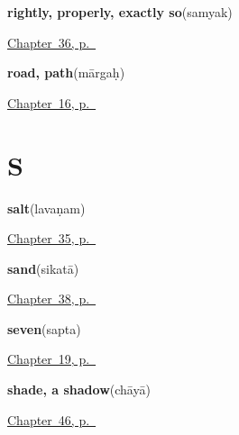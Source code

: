 \noindent\begin{minipage}[t]{\linewidth}
\raggedright
\textbf{rightly, properly, exactly so}\enspace\emph{}\enspace(samyak)\par
\footnotesize \hyperref[ch:sa-replies-more]{Chapter~36, p.~\pageref*{ch:sa-replies-more}}
\end{minipage}\par\smallskip

\noindent\begin{minipage}[t]{\linewidth}
\raggedright
\textbf{road, path}\enspace\emph{}\enspace(mārgaḥ)\par
\footnotesize \hyperref[ch:sa-places]{Chapter~16, p.~\pageref*{ch:sa-places}}
\end{minipage}\par\smallskip

\section*{S}

\noindent\begin{minipage}[t]{\linewidth}
\raggedright
\textbf{salt}\enspace\emph{}\enspace(lavaṇam)\par
\footnotesize \hyperref[ch:sa-house]{Chapter~35, p.~\pageref*{ch:sa-house}}
\end{minipage}\par\smallskip

\noindent\begin{minipage}[t]{\linewidth}
\raggedright
\textbf{sand}\enspace\emph{}\enspace(sikatā)\par
\footnotesize \hyperref[ch:sa-fire-and-stone]{Chapter~38, p.~\pageref*{ch:sa-fire-and-stone}}
\end{minipage}\par\smallskip

\noindent\begin{minipage}[t]{\linewidth}
\raggedright
\textbf{seven}\enspace\emph{}\enspace(sapta)\par
\footnotesize \hyperref[ch:sa-numbers-6-10]{Chapter~19, p.~\pageref*{ch:sa-numbers-6-10}}
\end{minipage}\par\smallskip

\noindent\begin{minipage}[t]{\linewidth}
\raggedright
\textbf{shade, a shadow}\enspace\emph{}\enspace(chāyā)\par
\footnotesize \hyperref[ch:sa-sun-and-shade]{Chapter~46, p.~\pageref*{ch:sa-sun-and-shade}}
\end{minipage}\par\smallskip

